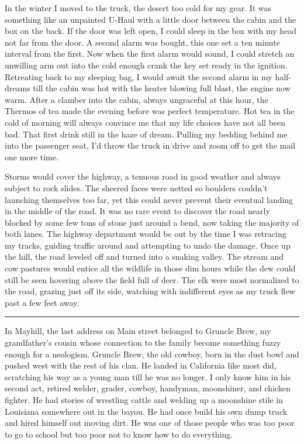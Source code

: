 \documentclass[ebook, 10pt, openright, onecolumn]{memoir}
\newcommand*\starbreak{\fancybreak*{\Large{* * *}}}
\begin{document}
In the winter I moved to the truck, the desert too cold for my gear.  It was
something like an unpainted U-Haul with a little door between the cabin and the
box on the back.  If the door was left open, I could sleep in the box with my
head not far from the door.  A second alarm was bought, this one set a ten
minute interval from the first.  Now when the first alarm would sound, I could
stretch an unwilling arm out into the cold enough crank the key set ready in the
ignition.  Retreating back to my sleeping bag, I would await the second alarm in
my half-dreams till the cabin was hot with the heater blowing full blast, the
engine now warm.  After a clamber into the cabin, always ungraceful at this
hour, the Thermos of tea made the evening before was perfect temperature.  Hot
tea in the cold of morning will always convince me that my life choices have not
all been bad.  That first drink still in the haze of dream. 
Pulling my bedding behind me into the passenger seat, I'd throw the truck in
drive and zoom off to get the mail one more time. 

Storms would cover the highway, a tenuous road in good weather and always
subject to rock slides.  The sheered faces were netted so boulders couldn't
launching themselves too far, yet this could never prevent their eventual
landing in the middle of the road.  It was no rare event to discover the road
nearly blocked by some few tons of stone just around a bend, now taking the
majority of both lanes.  The highway department would be out by the time I was
retracing my tracks, guiding traffic around and attempting to undo the damage.
Once up the hill, the road leveled off and turned into a snaking valley.  The
stream and cow pastures would entice all the wildlife in those dim hours while
the dew could still be seen hovering above the field full of deer.  The elk were
most normalized to the road, grazing just off its side, watching with
indifferent eyes as my truck flew past a few feet away.

\starbreak

In Mayhill, the last address on Main street belonged to Gruncle Brew, my
grandfather's cousin whose connection to the family become something fuzzy enough
for a neologism.  Gruncle Brew, the old cowboy, born in the dust bowl and pushed
west with the rest of his clan.  He landed in California like most did,
scratching his way as a young man till he was no longer.  I only know him in his
second act, retired welder, grader, cowboy, handyman, moonshiner, and chicken
fighter.  He had stories of wrestling cattle and welding up a moonshine stile in
Louisiana somewhere out in the bayou.  He had once build his own dump truck and
hired himself out moving dirt.  He was one of those people who was too poor to
go to school but too poor not to know how to do everything.
\end{document}
